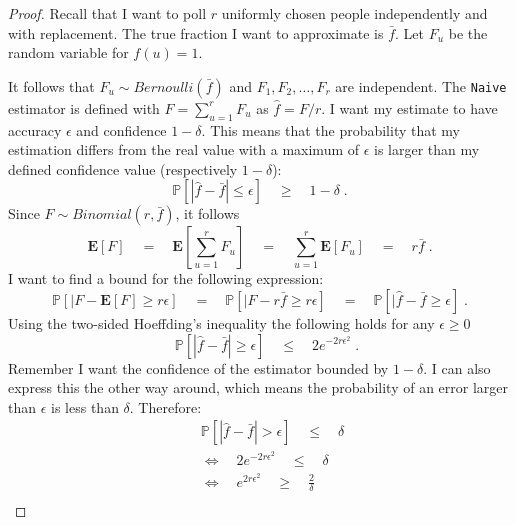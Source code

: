 \begin{proof}
Recall that I want to poll $r$ uniformly chosen people independently and with replacement. The true fraction I want to approximate is $\bar{f}$. Let $F_u$ be the random variable for $f(u) = 1$.

It follows that $F_u \sim  Bernoulli(\bar{f})$ and $F_1, F_2, \ldots , F_r$ are independent.
The \texttt{Naive} estimator is defined with $F = \sum_{u=1}^{r} F_u$ as $\hat{f} = F/r$.
I want my estimate to have accuracy $\epsilon$ and confidence $1-\delta$. This means that the probability that my estimation differs from the real value with a maximum of $\epsilon$ is larger than my defined confidence value (respectively $1-\delta$):
$$\mathds{P}[|\hat{f}-\bar{f} | \leq \epsilon] \quad\geq\quad 1-\delta \;.$$
Since $F \sim Binomial(r,\bar{f})$, it follows
$$\textbf{E}[F] \quad=\quad \textbf{E}[\sum_{u=1}^{r} F_u] \quad=\quad \sum_{u=1}^{r}\textbf{E}[F_u] \quad=\quad r\bar{f}\;.$$
I want to find a bound for the following expression:
$$\mathds{P}[|F-\textbf{E}[F] \geq r\epsilon] \quad=\quad \mathds{P}[|F-r\bar{f} \geq r\epsilon] \quad=\quad \mathds{P}[|\hat{f}-\bar{f} \geq \epsilon]\;.$$ 
Using the two-sided Hoeffding's inequality the following holds for any $\epsilon \geq 0$
$$\quad \mathds{P}[|\hat{f}-\bar{f}|\geq \epsilon] \quad\leq\quad 2e^{-2r\epsilon^2}\;.$$
Remember I want the confidence of the estimator bounded by $1-\delta$. I can also express this the other way around, which means the probability of an error larger than $\epsilon$ is less than $\delta$.
Therefore:
\begin{align*}
\quad&\mathds{P}[|\hat{f}-\bar{f} | > \epsilon] \quad\leq\quad \delta\\
&\Leftrightarrow\quad2e^{-2r\epsilon^2} \quad\leq\quad \delta\\
&\Leftrightarrow\quad e^{2r\epsilon^2} \quad\geq\quad \frac{2}{\delta}\\

\end{align*}
\end{proof}
